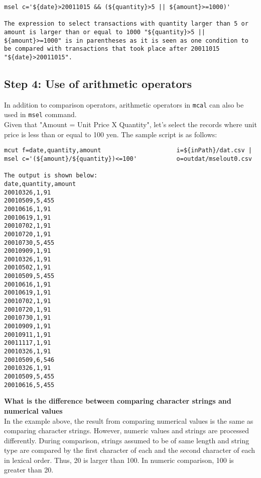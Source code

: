 \begin{verbatim}
msel c='${date}>20011015 && (${quantity}>5 || ${amount}>=1000)' 

The expression to select transactions with quantity larger than 5 or amount is larger than or equal to 1000 "${quantity}>5 || ${amount}>=1000" is in parentheses as it is seen as one condition to be compared with transactions that took place after 20011015 "${date}>20011015". 
\end{verbatim}

\subsection{Step 4: Use of arithmetic operators}

In addition to comparison operators, arithmetic operators in \verb|mcal| can also be used in \verb|msel| command. \\

Given that "Amount = Unit Price X Quantity", let's select the records where unit price is less than or equal to 100 yen. The sample script is as follows: 

\begin{verbatim}
mcut f=date,quantity,amount                     i=${inPath}/dat.csv |
msel c='(${amount}/${quantity})<=100'           o=outdat/mselout0.csv

The output is shown below: 
date,quantity,amount
20010326,1,91
20010509,5,455
20010616,1,91
20010619,1,91
20010702,1,91
20010720,1,91
20010730,5,455
20010909,1,91
20010326,1,91
20010502,1,91
20010509,5,455
20010616,1,91
20010619,1,91
20010702,1,91
20010720,1,91
20010730,1,91
20010909,1,91
20010911,1,91
20011117,1,91
20010326,1,91
20010509,6,546
20010326,1,91
20010509,5,455
20010616,5,455
\end{verbatim}

{\setlength{\parindent}{0cm}
\textbf{What is the difference between comparing character strings and numerical values }\\


In the example above, the result from comparing numerical values is the same as comparing character strings. However, numeric values and strings are processed differently. During comparison, strings assumed to be of same length and string type are compared by the first character of each and the second character of each in lexical order. Thus,  20 is larger than 100. In numeric comparison, 100 is greater than 20. 

}

